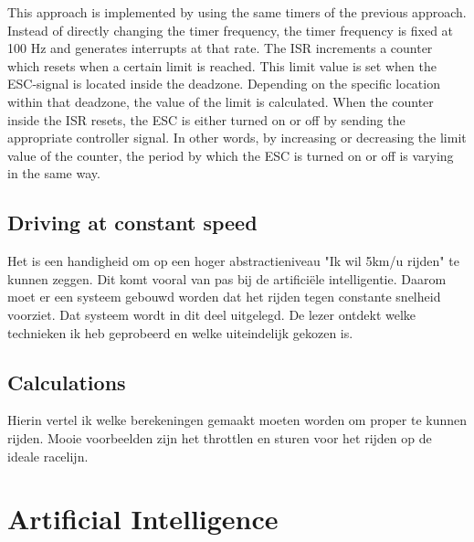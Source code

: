 \documentclass[conference,a4paper]{IEEEtran}
\begin{document}
This approach is implemented by using the same timers of the previous approach. Instead of directly changing the timer frequency, the timer frequency is fixed at 100 Hz and generates interrupts at that rate. The ISR increments a counter which resets when a certain limit is reached. This limit value is set when the ESC-signal is located inside the deadzone. Depending on the specific location within that deadzone, the value of the limit is calculated. When the counter inside the ISR resets, the ESC is either turned on or off by sending the appropriate controller signal. In other words, by increasing or decreasing the limit value of the counter, the period by which the ESC is turned on or off is varying in the same way.

\subsection{Driving at constant speed}
Het is een handigheid om op een hoger abstractieniveau "Ik wil 5km/u rijden" te kunnen zeggen. Dit komt vooral van pas bij de artificiële intelligentie. Daarom moet er een systeem gebouwd worden dat het rijden tegen constante snelheid voorziet. Dat systeem wordt in dit deel uitgelegd. De lezer ontdekt welke technieken ik heb geprobeerd en welke uiteindelijk gekozen is.

\subsection{Calculations}
Hierin vertel ik welke berekeningen gemaakt moeten worden om proper te kunnen rijden. Mooie voorbeelden zijn het throttlen en sturen voor het rijden op de ideale racelijn.

\section{Artificial Intelligence}
\end{document}
